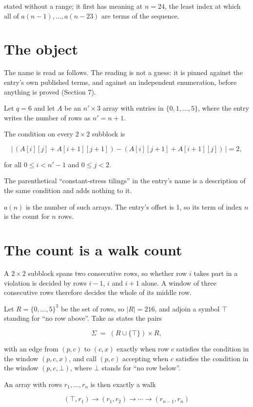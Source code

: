 \documentclass[11pt]{article}
\theoremstyle{definition}
\begin{document}
stated without a range; it first has meaning at $n = 24$, the least index at which all of $a(n-1),\dots,a(n-23)$ are terms of the sequence.

\section{The object}

The name is read as follows. The reading is not a guess: it is pinned against the entry's own published terms, and against an independent enumeration, before anything is proved (Section 7).

Let $q = 6$ and let $A$ be an $n' \times 3$ array with entries in $\{0,1,\dots,5\}$, where the entry writes the number of rows as $n' = n + 1$.

The condition on every $2 \times 2$ subblock is

\[\bigl|\,(A[i][j] + A[i{+}1][j{+}1]) - (A[i][j{+}1] + A[i{+}1][j])\,\bigr| = 2,\]

for all $0 \le i < n'-1$ and $0 \le j < 2$.

The parenthetical ``constant-stress tilings'' in the entry's name is a description of the same condition and adds nothing to it.

$a(n)$ is the number of such arrays. The entry's offset is 1, so its term of index $n$ is the count for $n$ rows.

\section{The count is a walk count}

A $2 \times 2$ subblock spans two consecutive rows, so whether row $i$ takes part in a violation is decided by rows $i-1$, $i$ and $i+1$ alone. A window of three consecutive rows therefore decides the whole of its middle row.

Let $R = \{0,\dots,5\}^{3}$ be the set of rows, so $|R| = 216$, and adjoin a symbol $\top$ standing for ``no row above''. Take as states the pairs

\[\Sigma \;=\; (R \cup \{\top\}) \times R,\]

with an edge from $(p,c)$ to $(c,x)$ exactly when row $c$ satisfies the condition in the window $(p,c,x)$, and call $(p,c)$ accepting when $c$ satisfies the condition in the window $(p,c,\bot)$, where $\bot$ stands for ``no row below''.

An array with rows $r_1,\dots,r_n$ is then exactly a walk

\[(\top,r_1) \to (r_1,r_2) \to \cdots \to (r_{n-1},r_n)\]
\end{document}
